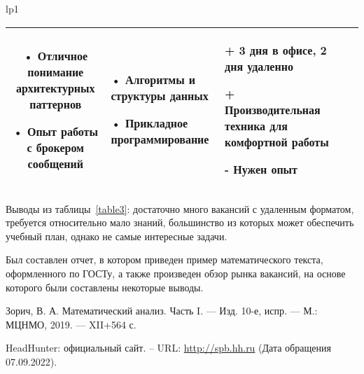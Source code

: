 \documentclass[14pt]{extreport}
\begin{document}
\begin{landscape}
\begin{longtable}[H]{lp{1\linewidth}}
\begin{small}
\begin{tabular}{|c|p{}|p{6cm}|p{5cm}|p{5cm}|}
•	Отличное понимание архитектурных паттернов 

•	Опыт работы с брокером сообщений &
•	Алгоритмы и структуры данных

•	Прикладное программирование & 
+	3 дня в офисе, 2 дня удаленно
 
+	Производительная техника для комфортной работы

-	Нужен опыт
\\

	\hline 


    \end{tabular}
    \end{small}
\end{longtable}

Выводы из таблицы~\ref{table3}: достаточно много вакансий с удаленным форматом, требуется относительно мало знаний, большинство из которых может обеспечить учебный план, однако не самые интересные задачи. 
\end{landscape}



\conclusions

Был составлен отчет, в котором приведен пример математического текста, оформленного по ГОСТу, а также произведен обзор рынка вакансий, на основе которого были составлены некоторые выводы.



\newpage
\begin{thebibliography}{99}
 Зорич, В. А. Математический анализ. Часть I. — Изд. 10-е, испр. — М.: МЦНМО, 2019. — XII+564 с.

 HeadHunter: официальный сайт. – URL: \url{http://spb.hh.ru} (Дата обращения 07.09.2022).
\end{thebibliography}
\end{document}
